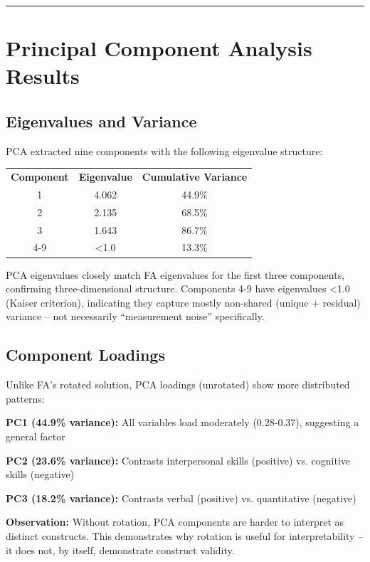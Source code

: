 \documentclass[
]{article}
\begin{document}
\begin{center}\rule{0.5\linewidth}{0.5pt}\end{center}

\section{Principal Component Analysis Results}

\subsection{Eigenvalues and Variance}

PCA extracted nine components with the following eigenvalue structure:

{\def\LTcaptype{none} %
\begin{longtable}[]{@{}ccc@{}}
\toprule\noalign{}
\endhead
\bottomrule\noalign{}
\endlastfoot
\textbf{Component} & \textbf{Eigenvalue} & \textbf{Cumulative
Variance} \\
1 & 4.062 & 44.9\% \\
2 & 2.135 & 68.5\% \\
3 & 1.643 & 86.7\% \\
4-9 & \textless1.0 & 13.3\% \\
\end{longtable}
}

PCA eigenvalues closely match FA eigenvalues for the first three
components, confirming three-dimensional structure. Components 4-9 have
eigenvalues \textless1.0 (Kaiser criterion), indicating they capture
mostly non-shared (unique + residual) variance -- not necessarily
``measurement noise'' specifically.

\subsection{Component Loadings}

Unlike FA's rotated solution, PCA loadings (unrotated) show more
distributed patterns:

\textbf{PC1 (44.9\% variance):} All variables load moderately
(0.28-0.37), suggesting a general factor

\textbf{PC2 (23.6\% variance):} Contrasts interpersonal skills
(positive) vs. cognitive skills (negative)

\textbf{PC3 (18.2\% variance):} Contrasts verbal (positive) vs.
quantitative (negative)

\textbf{Observation:} Without rotation, PCA components are harder to
interpret as distinct constructs. This demonstrates why rotation is
useful for interpretability -- it does not, by itself, demonstrate
construct validity.
\end{document}
